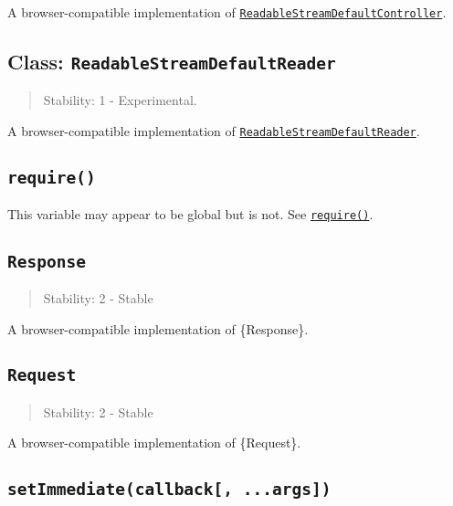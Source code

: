 A browser-compatible implementation of
\href{webstreams.md\#class-readablestreamdefaultcontroller}{\texttt{ReadableStreamDefaultController}}.

\subsection{\texorpdfstring{Class:
\texttt{ReadableStreamDefaultReader}}{Class: ReadableStreamDefaultReader}}\label{class-readablestreamdefaultreader}

\begin{quote}
Stability: 1 - Experimental.
\end{quote}

A browser-compatible implementation of
\href{webstreams.md\#class-readablestreamdefaultreader}{\texttt{ReadableStreamDefaultReader}}.

\subsection{\texorpdfstring{\texttt{require()}}{require()}}\label{require}

This variable may appear to be global but is not. See
\href{modules.md\#requireid}{\texttt{require()}}.

\subsection{\texorpdfstring{\texttt{Response}}{Response}}\label{response}

\begin{quote}
Stability: 2 - Stable
\end{quote}

A browser-compatible implementation of \{Response\}.

\subsection{\texorpdfstring{\texttt{Request}}{Request}}\label{request}

\begin{quote}
Stability: 2 - Stable
\end{quote}

A browser-compatible implementation of \{Request\}.

\subsection{\texorpdfstring{\texttt{setImmediate(callback{[},\ ...args{]})}}{setImmediate(callback{[}, ...args{]})}}\label{setimmediatecallback-...args}

